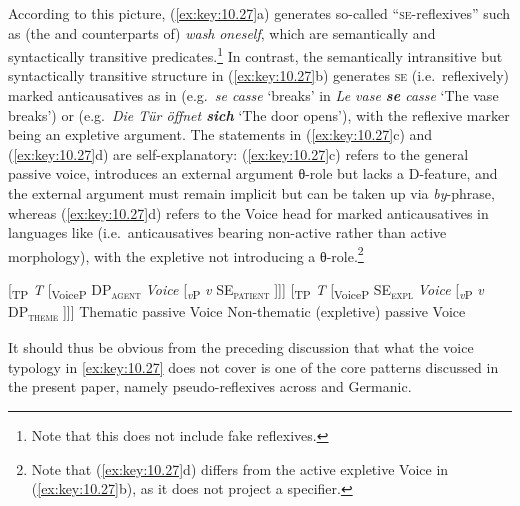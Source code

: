 \documentclass[output=paper]{langsci/langscibook}
\begin{document}
According to this picture, (\ref{ex:key:10.27}a) generates so-called
“\textsc{se}-reflexives” such as (the  and  counterparts of)
\emph{wash} \emph{oneself}, which are semantically and syntactically transitive
predicates.\footnote{Note that this does not include fake reflexives.} In
contrast, the semantically intransitive but syntactically transitive structure
in (\ref{ex:key:10.27}b) generates \textsc{se} (i.e.\ reflexively) marked
anticausatives as in  (e.g.\ \emph{se casse} ‘breaks’ in \emph{Le vase
\textbf{se} casse} ‘The vase breaks’) or  (e.g.\ \emph{Die Tür öffnet
\textbf{sich}} ‘The door opens’), with the reflexive marker being an expletive
argument. The statements in (\ref{ex:key:10.27}c) and (\ref{ex:key:10.27}d) are
self-explanatory: (\ref{ex:key:10.27}c) refers to the general passive voice,
introduces an external argument θ-role but lacks a D-feature, and the external
argument must remain implicit but can be taken up via \emph{by}{}-phrase,
whereas (\ref{ex:key:10.27}d) refers to the Voice head for marked
anticausatives in languages like  (i.e.\ anticausatives bearing non-active
rather than active morphology), with the expletive not introducing a
θ-role.\footnote{Note that (\ref{ex:key:10.27}d) differs from the active
expletive Voice in (\ref{ex:key:10.27}b), as it does not project a specifier.}

\ea\label{ex:key:10.27}
    \ea   {}[\textsubscript{TP} \emph{T} [\textsubscript{VoiceP} DP\textsubscript{\textsc{agent}} \emph{Voice} [\textsubscript{\emph{v}P} \emph{v} SE\textsubscript{\textsc{patient}} ]]]
    \ex   {}[\textsubscript{TP} \emph{T} [\textsubscript{VoiceP} SE\textsubscript{\textsc{expl}} \emph{Voice} [\textsubscript{\emph{v}P} \emph{v} DP\textsubscript{\textsc{theme}} ]]]
    \ex   Thematic passive Voice
    \ex   Non-thematic (expletive) passive Voice
    \z
\z

It should thus be obvious from the preceding discussion that what the voice
typology in \eqref{ex:key:10.27} does not cover is one of the core patterns
discussed in the present paper, namely pseudo-reflexives across  and
Germanic.
\end{document}
